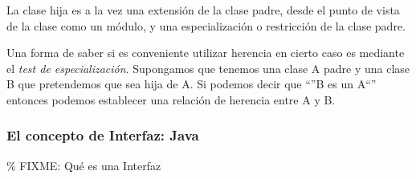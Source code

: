 \documentclass[10pt, a4paper]{article}
\newif\IfInSansMode
\begin{document}
La clase hija es a la vez una extensión de la clase padre, desde el
punto de vista de la clase como un módulo, y una especialización o
restricción de la clase padre.

Una forma de saber si es conveniente utilizar herencia en cierto caso es
mediante el \textit{test de especialización}. Supongamos que tenemos una
clase A padre y una clase B que pretendemos que sea hija de A. Si
podemos decir que ``''B es un A``'' entonces podemos establecer una
relación de herencia entre A y B.

\subsubsection{}

\subsubsection{}

\subsubsection{}

\subsubsection{}

\subsubsection{}

\subsubsection{}

\subsubsection{}

\subsubsection{}

\subsubsection{El concepto de Interfaz: Java}

\% FIXME: Qué es una Interfaz
\end{document}
